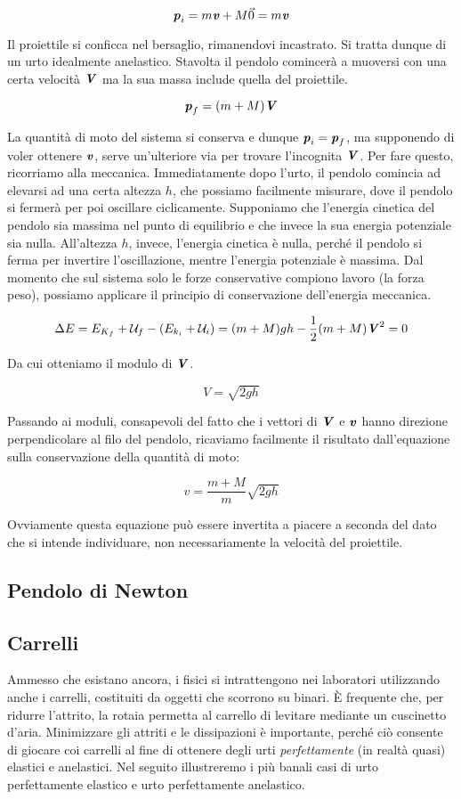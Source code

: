 \[ \textbf{\textit{p}}_i = m\textbf{\textit{v}} + M\vec{0} = m\textbf{\textit{v}} \]

\noindent Il proiettile si conficca nel bersaglio, rimanendovi incastrato.
Si tratta dunque di un urto idealmente anelastico. Stavolta il
pendolo comincerà a muoversi con una certa velocità $\textbf{\textit{V}}$
ma la sua massa include quella del proiettile.

\[ \textbf{\textit{p}}_f = (m + M)\textbf{\textit{V}} \]

\noindent La quantità di moto del sistema si conserva e dunque
$\textbf{\textit{p}}_i = \textbf{\textit{p}}_f$, ma supponendo di voler ottenere $\textbf{\textit{v}}$,
serve un'ulteriore
via per trovare l'incognita $\textbf{\textit{V}}$. Per fare questo, ricorriamo alla
meccanica. Immediatamente dopo l'urto, il pendolo comincia
ad elevarsi ad una certa altezza $h$, che possiamo
facilmente misurare, dove il pendolo si fermerà per poi oscillare
ciclicamente. Supponiamo che l'energia cinetica del pendolo sia
massima nel punto di equilibrio e che invece la sua energia potenziale
sia nulla. All'altezza $h$, invece, l'energia cinetica è nulla, perché
il pendolo si ferma per invertire l'oscillazione, mentre l'energia
potenziale è massima. Dal momento che sul sistema solo le forze
conservative compiono lavoro (la forza peso), possiamo applicare il
principio di conservazione dell'energia meccanica.

\[ \Delta E = E_{K_f} + \mathcal{U}_f - (E_{k_i} + \mathcal{U}_i) = (m + M)gh - \frac12(m + M)\textbf{\textit{V}}^2 = 0 \]

\noindent Da cui otteniamo il modulo di $\textbf{\textit{V}}$.

\[ V = \sqrt{2gh} \]

\noindent Passando ai moduli, consapevoli del fatto che i vettori
di $\textbf{\textit{V}}$ e $\textbf{\textit{v}}$ hanno direzione perpendicolare al
filo del pendolo, ricaviamo facilmente il risultato
dall'equazione sulla conservazione della quantità di moto:

\[ v = \frac{m + M}{m}\sqrt{2gh} \]

\noindent Ovviamente questa equazione può essere invertita a piacere
a seconda del dato che si intende individuare, non necessariamente
la velocità del proiettile.


\subsection{Pendolo di Newton}

\subsection{Carrelli}
Ammesso che esistano ancora, i fisici si intrattengono nei laboratori
utilizzando anche i carrelli, costituiti da oggetti che scorrono su
binari. È frequente che, per ridurre l'attrito, la rotaia permetta al
carrello di levitare mediante un cuscinetto d'aria. Minimizzare gli
attriti e le dissipazioni è importante, perché ciò consente di giocare
coi carrelli al fine di ottenere degli urti \textit{perfettamente} (in
realtà quasi) elastici e anelastici. Nel seguito illustreremo i più
banali casi di urto perfettamente elastico e urto perfettamente anelastico.

